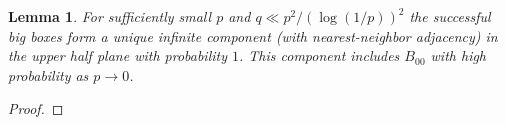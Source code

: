 \documentclass{article}
\renewcommand{\P}{\mathbb{P}}
\newcommand{\bZ}{{\mathbb Z}}
\numberwithin{equation}{section}
\newtheorem{lemma}[theorem]{Lemma}
\newcommand{\note}[1]{{\bf \textcolor{blue}
{[#1\marginpar{\textcolor{red}{***}}]}}}
\begin{document}
\begin{lemma}\label{lem:uniqueinfinitecomponent}
    For sufficiently small $p$ and $q \ll p^2 / (\log (1/p))^2$ the successful big boxes form a unique infinite component (with nearest-neighbor adjacency) in the upper half plane with probability $1$. This component includes $B_{00}$ with high probability as $p\to 0$.
\end{lemma}
\begin{proof}
    
    


\end{proof}
\end{document}
